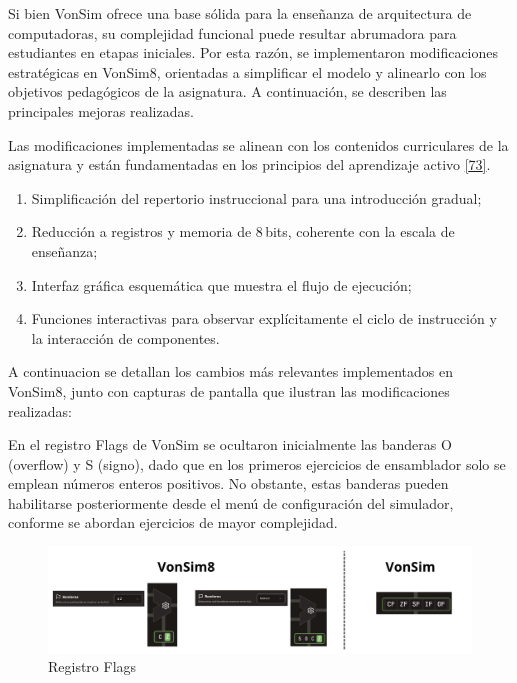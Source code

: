 \documentclass[12pt,oneside]{templates/unerthesis}
\providecommand{\tightlist}{%
  \setlength{\itemsep}{0pt}\setlength{\parskip}{0pt}}
\begin{document}
Si bien VonSim ofrece una base sólida para la enseñanza de arquitectura de computadoras, su complejidad funcional puede resultar abrumadora para estudiantes en etapas iniciales. Por esta razón, se implementaron modificaciones estratégicas en VonSim8, orientadas a simplificar el modelo y alinearlo con los objetivos pedagógicos de la asignatura. A continuación, se describen las principales mejoras realizadas.

Las modificaciones implementadas se alinean con los contenidos curriculares de la asignatura y están fundamentadas en los principios del aprendizaje activo \protect\hyperlink{ref-bonwell1991active}{{[}73{]}}.

\begin{enumerate}
\def\labelenumi{\arabic{enumi}.}
\tightlist
\item
  Simplificación del repertorio instruccional para una introducción gradual;
\item
  Reducción a registros y memoria de 8\,bits, coherente con la escala de enseñanza;
\item
  Interfaz gráfica esquemática que muestra el flujo de ejecución;
\item
  Funciones interactivas para observar explícitamente el ciclo de instrucción y la interacción de componentes.
\end{enumerate}

A continuacion se detallan los cambios más relevantes implementados en VonSim8, junto con capturas de pantalla que ilustran las modificaciones realizadas:

En el registro Flags de VonSim se ocultaron inicialmente las banderas O (overflow) y S (signo), dado que en los primeros ejercicios de ensamblador solo se emplean números enteros positivos. No obstante, estas banderas pueden habilitarse posteriormente desde el menú de configuración del simulador, conforme se abordan ejercicios de mayor complejidad.

\begin{figure}

{\centering \includegraphics[width=0.85\linewidth]{images/flags} 

}

\caption{Registro Flags}\label{fig:banderas}
\end{figure}
\end{document}
